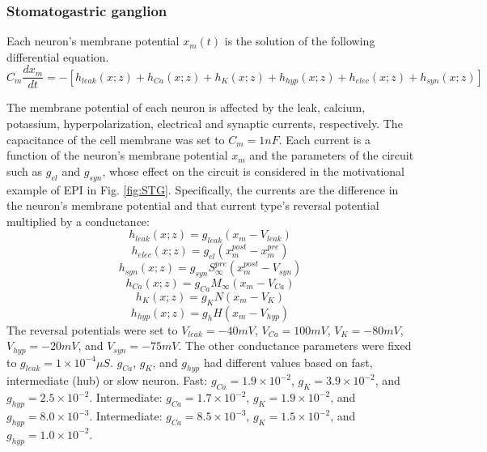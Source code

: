 \documentclass[11pt]{article}
\begin{document}
\subsubsection{Stomatogastric ganglion}\label{methods_STG}
Each neuron's membrane potential $x_m(t)$ is the solution of the following differential equation.
\begin{equation} C_m \frac{dx_m}{dt} = - \left[ h_{leak}(x; z) + h_{Ca}(x; z) + h_K(x; z) + h_{hyp}(x; z) + h_{elec}(x; z) + h_{syn}(x; z)\right] 
\end{equation} 

The membrane potential of each neuron is affected by the leak, calcium, potassium, hyperpolarization,
electrical and synaptic currents, respectively.  The capacitance of the cell membrane was set to $C_m = 1nF$. Each current is a function of the neuron's membrane potential $x_m$ and the parameters of the circuit such as  $g_{el}$ and $g_{syn}$, whose effect on the circuit is considered in the motivational example of EPI in Fig. \ref{fig:STG}.  Specifically, the currents are the difference in the neuron's membrane potential and that current type's reversal potential multiplied by a conductance:
\begin{equation}  h_{leak}(x; z) = g_{leak} (x_m - V_{leak}) 
\end{equation} 
\begin{equation}  h_{elec}(x; z) = g_{el} (x_m^{post} - x_m^{pre})
\end{equation} 
\begin{equation}  h_{syn}(x; z) = g_{syn} S_\infty^{pre} (x_m^{post} - V_{syn}) \end{equation} 
\begin{equation}  h_{Ca}(x; z) = g_{Ca} M_\infty (x_m - V_{Ca}) 
\end{equation} 
\begin{equation}  h_K(x; z) = g_K N (x_m - V_K) 
\end{equation} 
\begin{equation}  h_{hyp}(x; z) = g_h H(x_m - V_{hyp})
\end{equation} 
The reversal potentials were set to $V_{leak} = -40mV$, $V_{Ca} = 100mV$, $V_K = -80mV$, $V_{hyp} = -20mV$, and $V_{syn} = -75mV$.  The other conductance parameters were fixed to $g_{leak} = 1 \times 10^{-4} \mu S$. $g_{Ca}$, $g_{K}$, and $g_{hyp}$ had different values based on fast, intermediate (hub) or slow neuron.  Fast: $g_{Ca} = 1.9 \times 10^{-2}$, $ g_K = 3.9 \times 10^{-2} $, and $ g_{hyp} = 2.5 \times 10^{-2} $.  Intermediate: $g_{Ca} = 1.7 \times 10^{-2}$, $ g_K = 1.9 \times 10^{-2} $, and $ g_{hyp} = 8.0 \times 10^{-3} $.  Intermediate: $g_{Ca} = 8.5 \times 10^{-3}$, $ g_K = 1.5 \times 10^{-2} $, and $ g_{hyp} = 1.0 \times 10^{-2} $.
\end{document}
